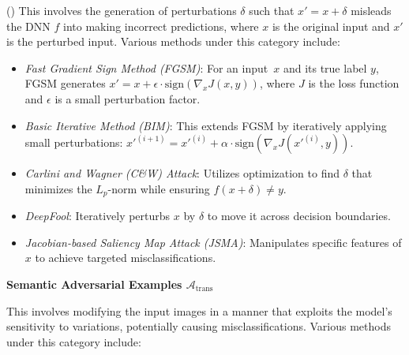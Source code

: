 (\adv) This involves the generation of perturbations $\delta$ such that $x' = x + \delta$ misleads the DNN $f$ into making incorrect predictions, where $x$ is the original input and $x'$ is the perturbed input. Various methods under this category include:

\begin{itemize}
    \item \emph{Fast Gradient Sign Method (FGSM)}: For an input~$x$ and its true label $y$, FGSM generates $x' = x + \epsilon \cdot \text{sign}(\nabla_x J(x, y))$, where $J$ is the loss function and $\epsilon$ is a small perturbation factor.
    \item \emph{Basic Iterative Method (BIM)}: This extends FGSM by iteratively applying small perturbations: $x'^{(i+1)} = x'^{(i)} + \alpha \cdot \text{sign}(\nabla_x J(x'^{(i)}, y))$.
    \item \emph{Carlini and Wagner (C\&W) Attack}: Utilizes optimization to find $\delta$ that minimizes the $L_p$-norm while ensuring $f(x + \delta) \neq y$.
    \item \emph{DeepFool}: Iteratively perturbs $x$ by $\delta$ to move it across decision boundaries.
    \item \emph{Jacobian-based Saliency Map Attack (JSMA)}: Manipulates specific features of $x$ to achieve targeted misclassifications.
\end{itemize}

\smallskip\noindent%
\textbf{Semantic Adversarial Examples $\mathcal{A}_{\text{trans}}$}

This involves modifying the input images in a manner that exploits the model's sensitivity to variations, potentially causing misclassifications. Various methods under this category include:

